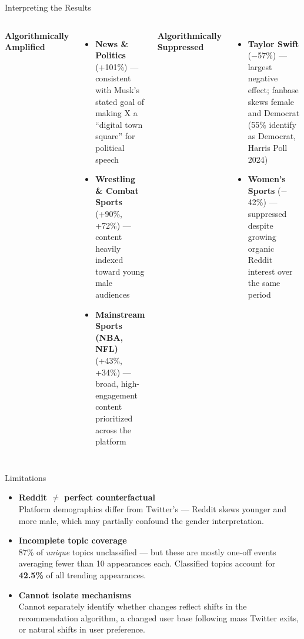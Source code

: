 \documentclass[aspectratio=169,t]{beamer}
\newcommand{\orange}[1]{\textcolor{uteporange}{\textbf{#1}}}
\newcommand{\blue}[1]{\textcolor{utepblue}{\textbf{#1}}}
\begin{document}
\begin{frame}{Interpreting the Results}
\begin{columns}[T]
    \orange{Algorithmically Amplified}
    \vspace{0.3em}
    \begin{itemize}\setlength\itemsep{0.4em}\small
      \item \textbf{News \& Politics} (+101\%) — consistent with Musk's stated goal of making X a ``digital town square'' for political speech
      \item \textbf{Wrestling \& Combat Sports} (+90\%, +72\%) — content heavily indexed toward young male audiences
      \item \textbf{Mainstream Sports (NBA, NFL)} (+43\%, +34\%) — broad, high-engagement content prioritized across the platform
    \end{itemize}

    \blue{Algorithmically Suppressed}
    \vspace{0.3em}
    \begin{itemize}\setlength\itemsep{0.4em}\small
      \item \textbf{Taylor Swift} ($-$57\%) — largest negative effect; fanbase skews female and Democrat (55\% identify as Democrat, Harris Poll 2024)
      \item \textbf{Women's Sports} ($-$42\%) — suppressed despite growing organic Reddit interest over the same period
    \end{itemize}

\end{columns}
\end{frame}

\begin{frame}{Limitations}
\begin{itemize}\setlength\itemsep{0.6em}
  \item \textbf{Reddit $\neq$ perfect counterfactual}\\
        \small Platform demographics differ from Twitter's — Reddit skews younger and more male, which may partially confound the gender interpretation.

  \item \textbf{Incomplete topic coverage}\\
        \small 87\% of \textit{unique} topics unclassified — but these are mostly one-off events averaging fewer than 10 appearances each. Classified topics account for \orange{42.5\%} of all trending appearances.

  \item \textbf{Cannot isolate mechanisms}\\
        \small Cannot separately identify whether changes reflect shifts in the recommendation algorithm, a changed user base following mass Twitter exits, or natural shifts in user preference.
\end{itemize}
\end{frame}
\end{document}
